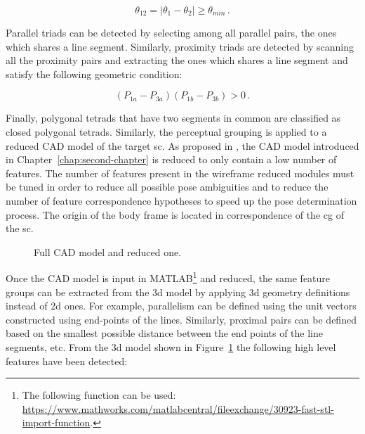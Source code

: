 \begin{equation}
  \theta_{12} = |\theta_1 - \theta_2| \geq \theta_{min} \,.
\end{equation}

Parallel triads can be detected by selecting among all parallel pairs, the ones which shares a line segment. Similarly, proximity triads are detected by scanning all the proximity pairs and extracting the ones which shares a line segment and satisfy the following geometric condition:

\begin{equation}
  (P_{1a} - P_{3a})(P_{1b}-P_{3b}) > 0 \,.
\end{equation}

Finally, polygonal tetrads that have two segments in common are classified as closed polygonal tetrads.
Similarly, the perceptual grouping is applied to a reduced CAD model of the target \acrshort{sc}. As proposed in \cite{Sharma2018}, the CAD model introduced in Chapter~\ref{chap:second-chapter} is reduced to only contain a low number of features. The number of features present in the wireframe reduced modules must be tuned in order to reduce all possible pose ambiguities and to reduce the number of feature correspondence hypotheses to speed up the pose determination process. The origin of the body frame is located in correspondence of the \acrshort{cg} of the \acrshort{sc}.

\begin{figure}[htbp]
  \centering
  \qquad
  \qquad
  \caption{Full CAD model and reduced one.}
  \label{fig:cadModel}
\end{figure}

Once the CAD model is input in MATLAB\footnote{The following function can be used: \url{https://www.mathworks.com/matlabcentral/fileexchange/30923-fast-stl-import-function}.} and reduced, the same feature groups can be extracted from the \acrshort{3d} model by applying \acrshort{3d} geometry definitions instead of \acrshort{2d} ones. For example, parallelism can be defined using the unit vectors constructed using end-points of the lines. Similarly, proximal pairs can be defined based on the smallest possible distance between the end points of the line segments, etc.
From the \acrshort{3d} model shown in Figure~\ref{fig:cadModel} the following high level features have been detected:

